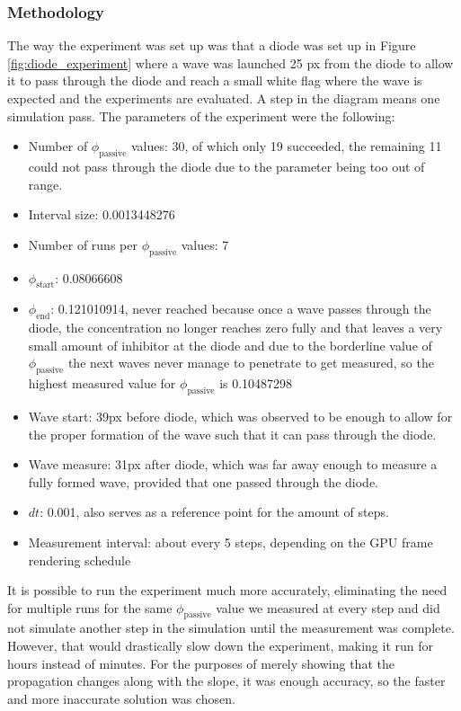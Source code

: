 \subsubsection*{Methodology}
The way the experiment was set up was that a diode was set up in Figure \ref{fig:diode_experiment} where a wave was launched 25 px from the diode to allow it to pass through the diode and reach a small white flag where the wave is expected and the experiments are evaluated. A step in the diagram means one simulation pass. The parameters of the experiment were the following:
\begin{itemize}
    \item Number of $\phi_{\text{passive}}$ values: 30, of which only 19 succeeded, the remaining 11 could not pass through the diode due to the parameter being too out of range.
    \item Interval size: 0.0013448276
    \item Number of runs per $\phi_{\text{passive}}$ values: 7
    \item $\phi_{\text{start}}$: 0.08066608
    \item $\phi_{\text{end}}$: 0.121010914, never reached because once a wave passes through the diode, the concentration no longer reaches zero fully and that leaves a very small amount of inhibitor at the diode and due to the borderline value of $\phi_{\text{passive}}$ the next waves never manage to penetrate to get measured, so the highest measured value for $\phi_{\text{passive}}$ is 0.10487298
    \item Wave start: 39px before diode, which was observed to be enough to allow for the proper formation of the wave
    such that it can pass through the diode.
    \item Wave measure: 31px after diode, which was far away enough to measure a fully formed wave, provided
    that one passed through the diode. 
    \item $dt$: 0.001, also serves as a reference point for the amount of steps.
    \item Measurement interval: about every 5 steps, depending on the GPU frame rendering schedule
\end{itemize}

It is possible to run the experiment much more accurately, eliminating the need for multiple runs for the same $\phi_{\text{passive}}$ value we measured at every step and did not simulate another step in the simulation until the measurement was complete. However, that would drastically slow down the experiment, making it run for hours instead of minutes. For the purposes of merely showing that the propagation changes along with the slope, it was enough accuracy, so the faster and more inaccurate solution was chosen.

